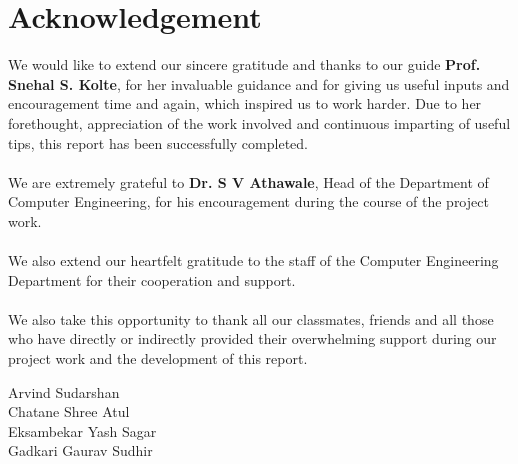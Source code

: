\documentclass[oneside, 12pt]{book}
\begin{document}
	\chapter*{Acknowledgement}
		We would like to extend our sincere gratitude and thanks to our guide \textbf{Prof. Snehal S. Kolte}, for her invaluable guidance and for giving us useful inputs and encouragement time and again, which inspired us to work harder. Due to her forethought, appreciation of the work involved and continuous imparting of useful tips, this report has been successfully completed.
		\\\\We are extremely grateful to \textbf{Dr. S V Athawale}, Head of the Department of Computer Engineering, for his encouragement during the course of the project work.
		\\\\We also extend our heartfelt gratitude to the staff of the Computer Engineering Department for their cooperation and support.
		\\\\We also take this opportunity to thank all our classmates, friends and all those who have directly or indirectly provided their overwhelming support during our project work and the development of this report.\break\break\break\break\break\break\break\break

		\begin{flushright}
		Arvind Sudarshan\\
		Chatane Shree Atul\\
		Eksambekar Yash Sagar\\
		Gadkari Gaurav Sudhir
		\end{flushright}
		
\end{document}
